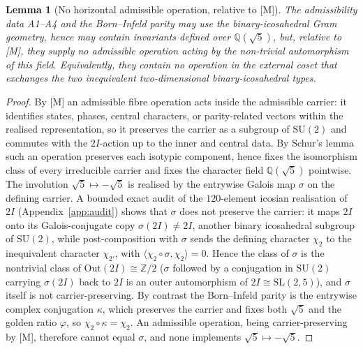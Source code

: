 \documentclass[11pt]{article}
\newtheorem{lemma}{Lemma}
\theoremstyle{definition}
\theoremstyle{remark}
\begin{document}
    \begin{lemma}[No horizontal admissible operation, relative to {[M]}]
      \label{lem:no-horizontal-admissible-operation}
      The admissibility data A1--A4 and the Born--Infeld parity may use the binary-icosahedral Gram geometry, hence
      may contain invariants defined over $\mathbb{Q}(\sqrt{5})$, but, relative to [M], they supply no admissible
      operation acting by the non-trivial automorphism of this field.
      Equivalently, they contain no operation in the external coset that exchanges the two inequivalent
      two-dimensional binary-icosahedral types.
    \end{lemma}

    \begin{proof}
      By [M] an admissible fibre operation acts inside the admissible carrier: it identifies states, phases, central
      characters, or parity-related vectors within the realised representation, so it preserves the carrier as a
      subgroup of $\mathrm{SU}(2)$ and commutes with the $2I$-action up to the inner and central data.
      By Schur's lemma such an operation preserves each isotypic component, hence fixes the isomorphism class of every
      irreducible carrier and fixes the character field $\mathbb{Q}(\sqrt{5})$ pointwise.
      The involution $\sqrt{5}\mapsto-\sqrt{5}$ is realised by the entrywise Galois map $\sigma$ on the defining
      carrier.
      A bounded exact audit of the $120$-element icosian realisation of $2I$ (Appendix~\ref{app:audit}) shows that
      $\sigma$ does not preserve the carrier: it maps $2I$ onto its Galois-conjugate copy $\sigma(2I)\neq2I$, another
      binary icosahedral subgroup of $\mathrm{SU}(2)$, while post-composition with $\sigma$ sends the defining
      character $\chi_2$ to the inequivalent character $\chi_{2'}$, with $\langle\chi_2\circ\sigma,\chi_2\rangle=0$.
      Hence the class of $\sigma$ is the nontrivial class of $\mathrm{Out}(2I)\cong\mathbb{Z}/2$ ($\sigma$ followed by a
      conjugation in $\mathrm{SU}(2)$ carrying $\sigma(2I)$ back to $2I$ is an outer automorphism of $2I\cong\mathrm{SL}(2,5)$),
      and $\sigma$ itself is not carrier-preserving.
      By contrast the Born--Infeld parity is the entrywise complex conjugation $\kappa$, which preserves the carrier
      and fixes both $\sqrt{5}$ and the golden ratio $\varphi$, so $\chi_2\circ\kappa=\chi_2$.
      An admissible operation, being carrier-preserving by [M], therefore cannot equal $\sigma$, and none implements
      $\sqrt{5}\mapsto-\sqrt{5}$.
    \end{proof}
\end{document}
